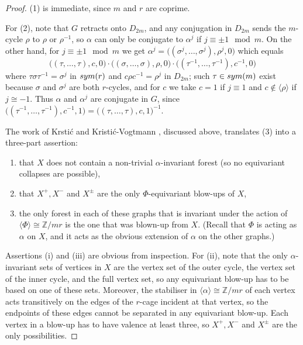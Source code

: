 \documentclass[11pt, a4 paper]{amsart}
\numberwithin{equation}{section}
\theoremstyle{remark}
\theoremstyle{definition}
\def\Z{\mathbb Z}
\def\sym{{\rm{sym}}}
\def\<{\langle}
\def\>{\rangle}
\begin{document}
\begin{proof}
	(1) is immediate, since $m$ and $r$ are coprime. 
	
	For (2), note that $G$ retracts onto $D_{2m}$, 
	and any conjugation in $D_{2m}$ 
	sends the $m$-cycle $\rho$ to $\rho$ or $\rho^{-1}$, 
	so $\alpha$ can only be conjugate to $\alpha^j$ 
	if $j \equiv \pm 1 \mod m$. 
	On the other hand, for $j \equiv \pm 1 \mod m$ we get 
	$\alpha^j = \big((\sigma^j, \dots, \sigma^j), \rho^{j}, 0)$ 
	which equals 
	\begin{equation*}
		\big((\tau, \dots, \tau), c, 0\big) \cdot 
		\big((\sigma,\dots,  \sigma), \rho, 0\big) \cdot
		\big((\tau^{-1}, \dots, \tau^{-1}), c^{-1}, 0\big)
	\end{equation*}
	where $\tau \sigma \tau^{-1} = \sigma^j$ in $\sym(r)$ 
	and $c \rho c^{-1} = \rho^j$ in $D_{2m}$;
	such $\tau \in \sym(m)$ exist 
	because $\sigma$ and $\sigma^j$ are both $r$-cycles, 
	and for $c$ we take $c=1$ if $j\equiv 1$ 
	and $c\not\in\<\rho\>$ if $j\cong -1$. 
	Thus $\alpha$ and $\alpha^j$ are conjugate in $G$, 
	since $\big((\tau^{-1},\dots, \tau^{-1}), c^{-1}, 1) = 
		\big((\tau,\dots,\tau), c, 1\big)^{-1}$. 
	
	The work of Krsti\'{c} \cite{krstic1989actions} 
	and Kristi\'{c}-Vogtmann \cite{krstic1993equivariant}, 
	discussed above, translates (3) 
	into a three-part assertion: 
	\begin{enumerate}[label=(\roman*)]
		\item 
			that $X$ does not contain 
			a non-trivial $\alpha$-invariant forest 
			(so no equivariant collapses are possible), 
		\item 
			that $X^+, X^-$ and $X^\pm$ are 
			the only $\Phi$-equivariant blow-ups of $X$, 
		\item 
			the only forest in each of these graphs 
			that is invariant under the action of 
			$\<\Phi\>\cong\Z/{mr}$
			is the one that was blown-up from $X$. 
			(Recall that $\Phi$ is acting as $\alpha$ on $X$, 
			and it acts as the obvious extension of $\alpha$ 
			on the other graphs.)
	\end{enumerate}

	Assertions (i) and (iii) are obvious from inspection. 
	For (ii), note that 
	the only $\alpha$-invariant sets of vertices in $X$ 
	are the vertex set of the outer cycle, 
	the vertex set of the inner cycle, 
	and the full vertex set, 
	so any equivariant blow-up has to be based on one of these
	sets. Moreover,  the stabiliser in $\<\alpha\>\cong \Z/mr$ of each vertex acts transitively on the edges of the $r$-cage
	incident at that vertex, so the endpoints of these edges cannot be separated in any equivariant blow-up. 
	Each vertex in a blow-up
	has to have valence at least three, so $X^+, X^-$ and $X^\pm$ are the only possibilities. 
\end{proof}
\end{document}

